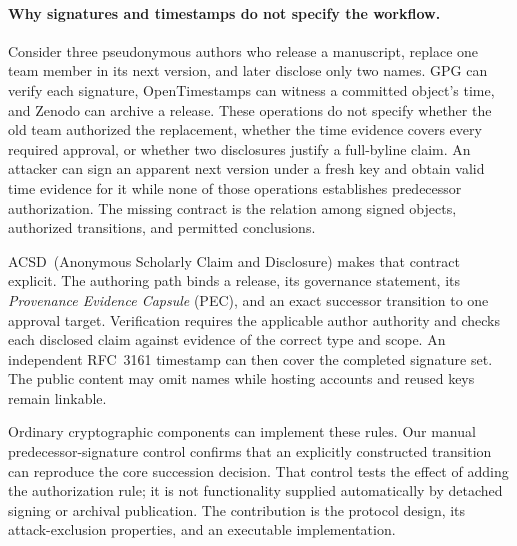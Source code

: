 \documentclass[conference,compsoc]{IEEEtran}
\newcommand{\acsd}{\textsc{ACSD}}
\begin{document}
\paragraph{Why signatures and timestamps do not specify the workflow.}
Consider three pseudonymous authors who release a manuscript, replace one team
member in its next version, and later disclose only two names. GPG can verify
each signature, OpenTimestamps can witness a committed object's time, and
Zenodo can archive a release. These operations do not specify whether the old
team authorized the replacement, whether the time evidence covers every
required approval, or whether two disclosures justify a full-byline claim.
An attacker can sign an apparent next version under a fresh key and obtain
valid time evidence for it while none of those operations establishes
predecessor authorization. The missing contract is the relation among signed
objects, authorized transitions, and permitted conclusions.

\acsd\ (Anonymous Scholarly Claim and Disclosure) makes that contract explicit.
The authoring path binds a release, its governance statement, its
\emph{Provenance Evidence Capsule} (PEC), and an exact successor transition to
one approval target. Verification requires the applicable author authority and
checks each disclosed claim against evidence of the correct type and scope.
An independent RFC~3161 timestamp can then cover the completed signature set.
The public content may omit names while hosting accounts and reused keys
remain linkable.

Ordinary cryptographic components can implement these rules. Our manual
predecessor-signature control confirms that an explicitly constructed transition
can reproduce the core succession decision. That control tests the effect of
adding the authorization rule; it is not functionality supplied automatically
by detached signing or archival publication. The contribution is the protocol
design, its attack-exclusion properties, and an executable implementation.
\end{document}
